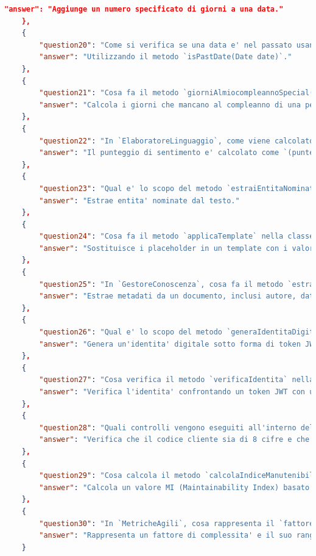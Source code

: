 \documentclass[12pt,a4paper,openright,twoside]{book}
\begin{document}
\begin{lstlisting}[language=json, caption={Domande/Risposte generate da NotebookLM}]
        "answer": "Aggiunge un numero specificato di giorni a una data."
    },
    {
        "question20": "Come si verifica se una data e' nel passato usando la classe `DateUtilCustom`?",
        "answer": "Utilizzando il metodo `isPastDate(Date date)`."
    },
    {
        "question21": "Cosa fa il metodo `giorniAlmiocompleannoSpecial(Date dataNascita, String nome)` nella classe `DateUtilCustom`?",
        "answer": "Calcola i giorni che mancano al compleanno di una persona e restituisce un messaggio personalizzato."
    },
    {
        "question22": "In `ElaboratoreLinguaggio`, come viene calcolato il punteggio di sentimento di un testo?",
        "answer": "Il punteggio di sentimento e' calcolato come `(punteggioPositivo - punteggioNegativo) / (double) (punteggioPositivo + punteggioNegativo + 1)`."
    },
    {
        "question23": "Qual e' lo scopo del metodo `estraiEntitaNominate` nella classe `ElaboratoreLinguaggio`?",
        "answer": "Estrae entita' nominate dal testo."
    },
    {
        "question24": "Cosa fa il metodo `applicaTemplate` nella classe `GestoreConfigurazioni`?",
        "answer": "Sostituisce i placeholder in un template con i valori corrispondenti forniti in una mappa di configurazioni."
    },
    {
        "question25": "In `GestoreConoscenza`, cosa fa il metodo `estraiMetadati`?",
        "answer": "Estrae metadati da un documento, inclusi autore, data e parole chiave."
    },
    {
        "question26": "Qual e' lo scopo del metodo `generaIdentitaDigitale` nella classe `GestoreIdentita` e cosa prende come input?",
        "answer": "Genera un'identita' digitale sotto forma di token JWT firmato digitalmente. Prende come input dati biometrici codificati (`byte[] parametriBiometrici`)."
    },
    {
        "question27": "Cosa verifica il metodo `verificaIdentita` nella classe `GestoreIdentita`?",
        "answer": "Verifica l'identita' confrontando un token JWT con un'impronta hash attesa."
    },
    {
        "question28": "Quali controlli vengono eseguiti all'interno del metodo `generaChiaveAttivazione` della classe `GestoreLicenze`?",
        "answer": "Verifica che il codice cliente sia di 8 cifre e che la data di scadenza sia nel formato corretto (AAAAMMGG)."
    },
    {
        "question29": "Cosa calcola il metodo `calcolaIndiceManutenibilita` della classe `IspezionatoreCodice`?",
        "answer": "Calcola un valore MI (Maintainability Index) basato su metriche interne come la lunghezza delle righe, il numero di commenti e la complessita' ciclomatica."
    },
    {
        "question30": "In `MetricheAgili`, cosa rappresenta il `fattoreComplessita'` nel metodo `calcolaVelocityScore` e qual e' il suo range?",
        "answer": "Rappresenta un fattore di complessita' e il suo range e' da 1 a 5."
    }
\end{lstlisting}
\end{document}
